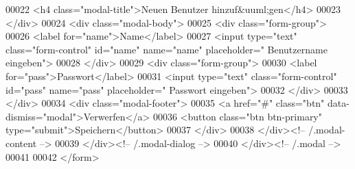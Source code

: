 \begin{DoxyCode}
00022                   <h4 \textcolor{keyword}{class}=\textcolor{stringliteral}{"modal-title"}>Neuen Benutzer hinzuf&uuml;gen</h4>
00023                 </div>
00024                 <div \textcolor{keyword}{class}=\textcolor{stringliteral}{"modal-body"}>
00025                   <div \textcolor{keyword}{class}=\textcolor{stringliteral}{"form-group"}>
00026                             <label \textcolor{keywordflow}{for}=\textcolor{stringliteral}{"name"}>Name</label>
00027                             <input type=\textcolor{stringliteral}{"text"} \textcolor{keyword}{class}=\textcolor{stringliteral}{"form-control"} \textcolor{keywordtype}{id}=\textcolor{stringliteral}{"name"} name=\textcolor{stringliteral}{"name"} placeholder=\textcolor{stringliteral}{"
      Benutzername eingeben"}>
00028                           </div>
00029                           <div \textcolor{keyword}{class}=\textcolor{stringliteral}{"form-group"}>
00030                             <label \textcolor{keywordflow}{for}=\textcolor{stringliteral}{"pass"}>Passwort</label>
00031                             <input type=\textcolor{stringliteral}{"text"} \textcolor{keyword}{class}=\textcolor{stringliteral}{"form-control"} \textcolor{keywordtype}{id}=\textcolor{stringliteral}{"pass"} name=\textcolor{stringliteral}{"pass"} placeholder=\textcolor{stringliteral}{"
      Passwort eingeben"}>
00032                           </div>
00033                 </div>
00034                 <div \textcolor{keyword}{class}=\textcolor{stringliteral}{"modal-footer"}>
00035                   <a href=\textcolor{stringliteral}{"#"} \textcolor{keyword}{class}=\textcolor{stringliteral}{"btn"} data-dismiss=\textcolor{stringliteral}{"modal"}>Verwerfen</a>
00036                   <button \textcolor{keyword}{class}=\textcolor{stringliteral}{"btn btn-primary"} type=\textcolor{stringliteral}{"submit"}>Speichern</button>
00037                 </div>
00038               </div><!-- /.modal-content -->
00039             </div><!-- /.modal-dialog -->
00040           </div><!-- /.modal -->
00041           
00042           </form>
\end{DoxyCode}
